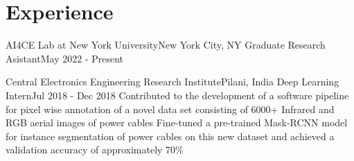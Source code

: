 \section{Experience}
\resumeSubHeadingListStart

\resumeHeadingFour
{AI4CE Lab at New York University}{New York City, NY}
{Graduate Research Asistant}{May 2022 - Present}
\resumeItemListStart

\resumeItemListEnd

\resumeHeadingFour
{Central Electronics Engineering Research Institute}{Pilani, India}
{Deep Learning Intern}{Jul 2018 - Dec 2018}
\resumeItemListStart
{}
{Contributed to the development of a software pipeline for pixel wise annotation of a novel data set consisting of 6000+ Infrared and RGB aerial images of power cables}
{Fine-tuned a pre-trained Mask-RCNN model for instance segmentation of power cables on this new dataset and achieved a validation accuracy of approximately 70\%}
\resumeItemListEnd

\resumeSubHeadingListEnd
